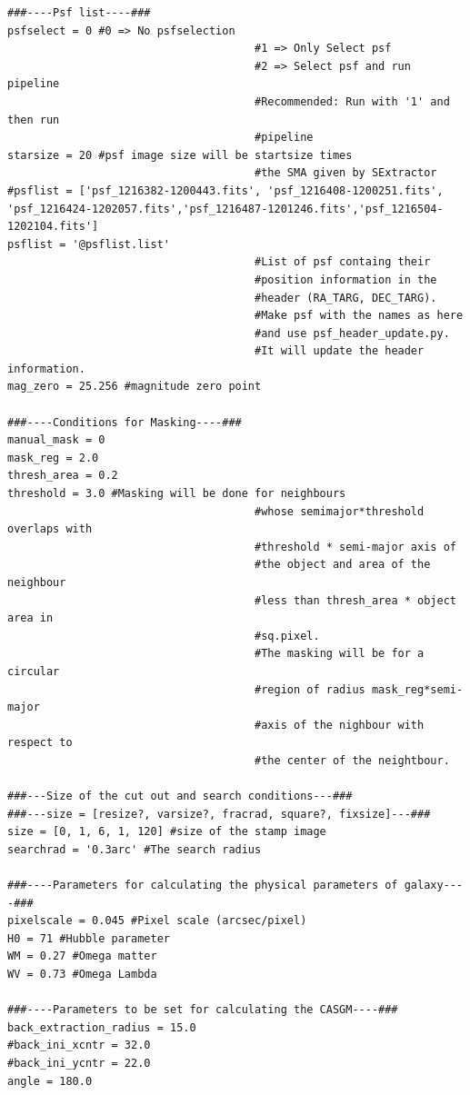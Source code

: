 \documentclass[a4paper,10pt]{article}
\begin{document}
\begin{footnotesize}
\begin{verbatim}
###----Psf list----###
psfselect = 0 #0 => No psfselection
                                      #1 => Only Select psf
                                      #2 => Select psf and run pipeline
                                      #Recommended: Run with '1' and then run
                                      #pipeline
starsize = 20 #psf image size will be startsize times
                                      #the SMA given by SExtractor
#psflist = ['psf_1216382-1200443.fits', 'psf_1216408-1200251.fits', 'psf_1216424-1202057.fits','psf_1216487-1201246.fits','psf_1216504-1202104.fits']
psflist = '@psflist.list'
                                      #List of psf containg their
                                      #position information in the
                                      #header (RA_TARG, DEC_TARG).
                                      #Make psf with the names as here
                                      #and use psf_header_update.py.
                                      #It will update the header information.
mag_zero = 25.256 #magnitude zero point

###----Conditions for Masking----###
manual_mask = 0
mask_reg = 2.0
thresh_area = 0.2
threshold = 3.0 #Masking will be done for neighbours
                                      #whose semimajor*threshold overlaps with
                                      #threshold * semi-major axis of
                                      #the object and area of the neighbour
                                      #less than thresh_area * object area in
                                      #sq.pixel.
                                      #The masking will be for a circular
                                      #region of radius mask_reg*semi-major
                                      #axis of the nighbour with respect to
                                      #the center of the neightbour.

###---Size of the cut out and search conditions---###
###---size = [resize?, varsize?, fracrad, square?, fixsize]---###
size = [0, 1, 6, 1, 120] #size of the stamp image
searchrad = '0.3arc' #The search radius

###----Parameters for calculating the physical parameters of galaxy----###
pixelscale = 0.045 #Pixel scale (arcsec/pixel)
H0 = 71 #Hubble parameter
WM = 0.27 #Omega matter
WV = 0.73 #Omega Lambda

###----Parameters to be set for calculating the CASGM----###
back_extraction_radius = 15.0
#back_ini_xcntr = 32.0
#back_ini_ycntr = 22.0
angle = 180.0


\end{verbatim}
\end{footnotesize}
\end{document}
